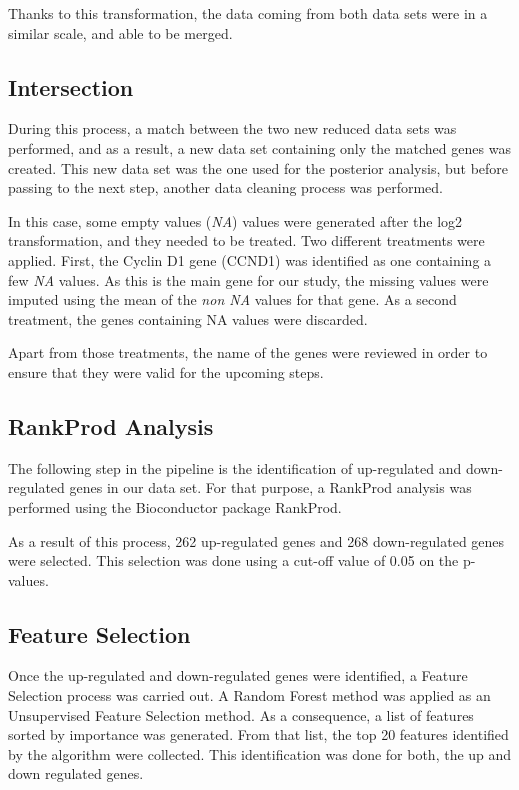 Thanks to this transformation, the data coming from both data sets were in a similar scale, and able to be merged.

\subsection{Intersection}

During this process, a match between the two new reduced data sets was performed, and as a result, a new data set containing only the matched genes was created. This new data set was the one used for the posterior analysis, but before passing to the next step, another data cleaning process was performed.

In this case, some empty values (\textit{NA}) values were generated after the log2 transformation, and they needed to be treated.
Two different treatments were applied. First, the Cyclin D1 gene (CCND1) was identified as one containing a few \textit{NA} values. As this is the main gene for our study, the missing values were imputed using the mean of the \textit{non NA} values for that gene.
As a second treatment, the genes containing NA values were discarded.

Apart from those treatments, the name of the genes were reviewed in order to ensure that they were valid for the upcoming steps.

\subsection{RankProd Analysis}
The following step in the pipeline is the identification of up-regulated and down-regulated genes in our data set. For that purpose, a RankProd analysis was performed using the Bioconductor package RankProd. 

As a result of this process, 262 up-regulated genes and 268 down-regulated genes were selected. This selection was done using a cut-off value of 0.05 on the p-values.

\subsection{Feature Selection}
Once the up-regulated and down-regulated genes were identified, a Feature Selection process was carried out. 
A Random Forest method was applied as an Unsupervised Feature Selection method.
As a consequence, a list of features sorted by importance was generated. From that list, the top 20 features identified by the algorithm were collected. This identification was done for both, the up and down regulated genes.

